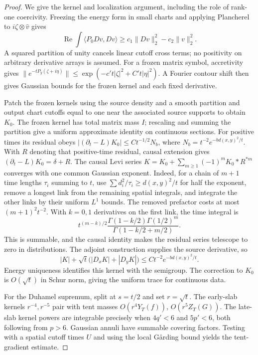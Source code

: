 \documentclass[11pt]{article}
\numberwithin{equation}{section}
\theoremstyle{definition}
\theoremstyle{remark}
\begin{document}
\begin{proof}
We give the kernel and localization argument, including the
role of rank-one coercivity. Freezing the energy form in small
charts and applying Plancherel to $i\zeta\otimes\widehat v$
gives
\[
 \operatorname{Re}\int\langle P_0Dv,Dv\rangle
       \ge c_1\|Dv\|_2^2-c_2\|v\|_2^2.
\]
A squared partition of unity cancels linear cutoff cross terms;
no positivity on arbitrary derivative arrays is assumed.
For a frozen matrix symbol, accretivity gives
$\|e^{-tP_y(\zeta+i\eta)}\|
\le\exp(-c't|\zeta|^2+C't|\eta|^2)$.
A Fourier contour shift then gives Gaussian bounds for the
frozen kernel and each fixed derivative.

Patch the frozen kernels using the source density and a smooth
partition and output chart cutoffs equal to one near the
associated source supports to obtain $K_0$. The frozen kernel
has total matrix mass $I$; rescaling and summing the partition
give a uniform approximate identity on continuous sections.
For positive times its residual obeys
$|(\partial_t-L)K_0|\le Ct^{-1/2}N_b$, where
$N_b=t^{-2}e^{-bd(x,y)^2/t}$. With $R$ denoting that
positive-time residual, causal extension gives
$(\partial_t-L)K_0=\delta+R$. The causal Levi series
$K=K_0+\sum_{m\ge1}(-1)^mK_0*R^{*m}$ converges with one common
Gaussian exponent. Indeed, for a chain of $m+1$ time lengths
$\tau_i$ summing to $t$, use
$\sum d_i^2/\tau_i\ge d(x,y)^2/t$ for half the exponent,
remove a longest link from the remaining spatial integrals,
and integrate the other links by their uniform $L^1$ bounds.
The removed prefactor costs at most $(m+1)^2t^{-2}$.
With $k=0,1$ derivatives on the first link, the time integral is
\[
 t^{(m-k)/2}
 \frac{\Gamma(1-k/2)\Gamma(1/2)^m}
      {\Gamma(1-k/2+m/2)}.
\]
This is summable, and the causal identity makes the residual
series telescope to zero in distributions.
The adjoint construction supplies the source
derivative, so
\[
 |K|+\sqrt t\bigl(|D_xK|+|D_yK|\bigr)
       \le Ct^{-2}e^{-bd(x,y)^2/t}.
\]
Energy uniqueness identifies this kernel with the semigroup.
The correction to $K_0$ is $O(\sqrt t)$ in Schur norm, giving
the uniform trace for continuous data.

For the Duhamel supremum, split at $s=t/2$ and set $r=\sqrt t$.
The early-slab kernels $r^{-4},r^{-5}$ pair with tent masses
$O(r^4Y_T(f))$, $O(r^5Z_T(G))$. The late-slab kernel powers
are integrable precisely when $4q'<6$ and $5p'<6$, both
following from $p>6$. Gaussian annuli have summable covering
factors. Testing with a spatial cutoff times $U$ and using the
local Gårding bound yields the tent-gradient estimate.


\end{proof}
\end{document}
